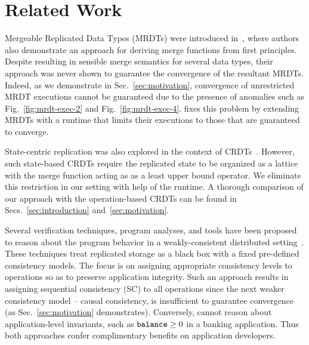 \section{Related Work}
\label{sec:related}

\balance
Mergeable Replicated Data Types (MRDTs) were introduced
in~\cite{mrdt}, where authors also demonstrate an approach for
deriving merge functions from first principles.  Despite resulting in
sensible merge semantics for several data types, their approach was
never shown to guarantee the convergence of the resultant MRDTs.
Indeed, as we demonstrate in Sec.~\ref{sec:motivation}, convergence
of unrestricted MRDT executions cannot be guaranteed due to the
presence of anomalies such as Fig.~\ref{fig:mrdt-exec-2} and
Fig.~\ref{fig:mrdt-exec-4}. \quark fixes this problem by extending
MRDTs with a runtime that limits their executions to those that are
guaranteed to converge.


State-centric replication was also explored in the context of
CRDTs~\cite{crdts}. However, such state-based CRDTs require the
replicated state to be organized as a lattice with the merge function
acting as as a least upper bound operator. We eliminate this
restriction in our setting with help of the \quark runtime. A thorough
comparison of our approach with the operation-based CRDTs can be found
in Secs.~\ref{sec:introduction} and~\ref{sec:motivation}.

Several verification techniques, program analyses, and tools have been
proposed to reason about the program behavior in a weakly-consistent
distributed setting~\cite{bailis-vldb, alvaro-calm,
gotsman-popl16, pldi15, redblue-osdi}. These techniques
treat replicated storage as a black box with a fixed pre-defined
consistency models. The focus is on assigning appropriate consistency
levels to operations so as to preserve application integrity. Such an
approach results in assigning sequential consistency (SC) to all
operations since the next weaker consistency model -- causal
consistency, is insufficient to guarantee convergence (as
Sec.~\ref{sec:motivation} demonstrates). Conversely, \quark cannot
reason about application-level invariants, such as ${\tt balance}\ge 0$
in a banking application. Thus both approaches confer complimentary
benefits on application developers.

